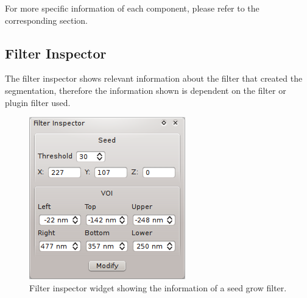 For more specific information of each component, please refer to the
corresponding section.

\subsection{Filter Inspector}
The filter inspector shows relevant information about the filter that created the segmentation,
therefore the information shown is dependent on the filter or plugin filter used.

\begin{figure}[H]
\centering
\includegraphics{fig/SeedGrowSegmentationFilterInspector}
\caption{Filter inspector widget showing the information of a seed grow filter.}
\end{figure}
